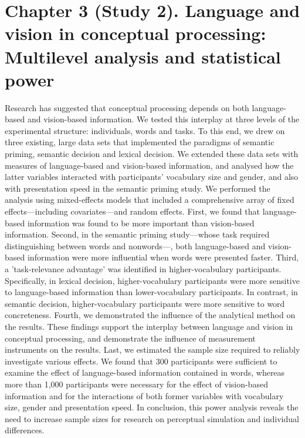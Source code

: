 \documentclass[
  12pt,
  man,floatsintext]{apa7}
\begin{document}
\clearpage

\hypertarget{chapter-3-study-2.-language-and-vision-in-conceptual-processing-multilevel-analysis-and-statistical-power}{%
\section{Chapter 3 (Study 2). Language and vision in conceptual processing: Multilevel analysis and statistical power}\label{chapter-3-study-2.-language-and-vision-in-conceptual-processing-multilevel-analysis-and-statistical-power}}

\bigskip
\bigskip
\bigskip

\begin{adjustwidth}{1.5cm}{1.5cm}

Research has suggested that conceptual processing depends on both language-based and vision-based information. We tested this interplay at three levels of the experimental structure: individuals, words and tasks. To this end, we drew on three existing, large data sets that implemented the paradigms of semantic priming, semantic decision and lexical decision. We extended these data sets with measures of language-based and vision-based information, and analysed how the latter variables interacted with participants' vocabulary size and gender, and also with presentation speed in the semantic priming study. We performed the analysis using mixed-effects models that included a comprehensive array of fixed effects---including covariates---and random effects. First, we found that language-based information was found to be more important than vision-based information. Second, in the semantic priming study---whose task required distinguishing between words and nonwords---, both language-based and vision-based information were more influential when words were presented faster. Third, a 'task-relevance advantage' was identified in higher-vocabulary participants. Specifically, in lexical decision, higher-vocabulary participants were more sensitive to language-based information than lower-vocabulary participants. In contrast, in semantic decision, higher-vocabulary participants were more sensitive to word concreteness. Fourth, we demonstrated the influence of the analytical method on the results. These findings support the interplay between language and vision in conceptual processing, and demonstrate the influence of measurement instruments on the results. Last, we estimated the sample size required to reliably investigate various effects. We found that 300 participants were sufficient to examine the effect of language-based information contained in words, whereas more than 1,000 participants were necessary for the effect of vision-based information and for the interactions of both former variables with vocabulary size, gender and presentation speed. In conclusion, this power analysis reveals the need to increase sample sizes for research on perceptual simulation and individual differences.

\end{adjustwidth}
\end{document}
